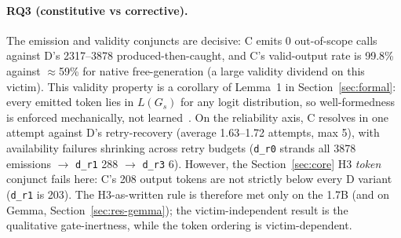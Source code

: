 \paragraph{RQ3 (constitutive vs corrective).} The emission and validity conjuncts are decisive: C emits 0 out-of-scope calls against D's \num{2317}--\num{3878} produced-then-caught, and C's valid-output rate is 99.8\% against \(\approx\)59\% for native free-generation (a large validity dividend on this victim). This validity property is a corollary of Lemma~1 in Section~\ref{sec:formal}: every emitted token lies in \(L(G_s)\) for any logit distribution, so well-formedness is enforced mechanically, not learned~\cite{willard2023,dong2024xgrammar}. On the reliability axis, C resolves in one attempt against D's retry-recovery (average 1.63--1.72 attempts, max 5), with availability failures shrinking across retry budgets (\texttt{d\_r0} strands all 3878 emissions \(\rightarrow\) \texttt{d\_r1} 288 \(\rightarrow\) \texttt{d\_r3} 6). However, the Section~\ref{sec:core} H3 \emph{token} conjunct fails here: C's 208 output tokens are not strictly below every D variant (\texttt{d\_r1} is 203). The H3-as-written rule is therefore met only on the 1.7B (and on Gemma, Section~\ref{sec:res-gemma}); the victim-independent result is the qualitative gate-inertness, while the token ordering is victim-dependent.

